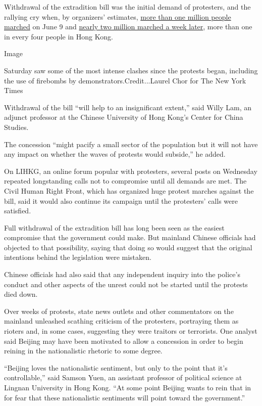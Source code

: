 Withdrawal of the extradition bill was the initial demand of protesters,
and the rallying cry when, by organizers' estimates,
\href{https://www.nytimes3xbfgragh.onion/2019/06/09/world/asia/hong-kong-extradition-protest.html}{more
than one million people marched} on June 9 and
\href{https://www.nytimes3xbfgragh.onion/2019/06/16/world/asia/carrie-lam-hong-kong-protests.html}{nearly
two million marched a week later}, more than one in every four people in
Hong Kong.

Image

Saturday saw some of the most intense clashes since the protests began,
including the use of firebombs by demonstrators.Credit...Laurel Chor for
The New York Times

Withdrawal of the bill ``will help to an insignificant extent,'' said
Willy Lam, an adjunct professor at the Chinese University of Hong Kong's
Center for China Studies.

The concession ``might pacify a small sector of the population but it
will not have any impact on whether the waves of protests would
subside,'' he added.

On LIHKG, an online forum popular with protesters, several posts on
Wednesday repeated longstanding calls not to compromise until all
demands are met. The Civil Human Right Front, which has organized huge
protest marches against the bill, said it would also continue its
campaign until the protesters' calls were satisfied.

Full withdrawal of the extradition bill has long been seen as the
easiest compromise that the government could make. But mainland Chinese
officials had objected to that possibility, saying that doing so would
suggest that the original intentions behind the legislation were
mistaken.

Chinese officials had also said that any independent inquiry into the
police's conduct and other aspects of the unrest could not be started
until the protests died down.

Over weeks of protests, state news outlets and other commentators on the
mainland unleashed scathing criticism of the protesters, portraying them
as rioters and, in some cases, suggesting they were traitors or
terrorists. One analyst said Beijing may have been motivated to allow a
concession in order to begin reining in the nationalistic rhetoric to
some degree.

``Beijing loves the nationalistic sentiment, but only to the point that
it's controllable,'' said Samson Yuen, an assistant professor of
political science at Lingnan University in Hong Kong. ``At some point
Beijing wants to rein that in for fear that these nationalistic
sentiments will point toward the government.''

